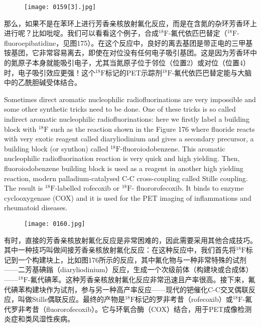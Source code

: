 \documentclass[dvipsnames, svgnames,a4paper,11pt]{article}
\begin{document}
\begin{figure}[h]
	\centering
    \texttt{[image: 0159[3].jpg]}    
     \label{fig175}
\end{figure}

那么，如果不是在苯环上进行芳香亲核放射氟化反应，而是在含氮的杂环芳香环上进行呢？比如吡啶。我们可以看看这个例子，合成${}^\mathrm{18}\mathrm{F}$-氟代依匹巴替定（${}^\mathrm{18}\mathrm{F}$-fluoroepibatidine，见图175）。在这个反应中，良好的离去基团是带正电的三甲基铵基团，它非常容易离去，即使在对位没有任何电子吸引基团。这是因为芳香环中的氮原子本身就能吸引电子，尤其当氮原子位于邻位（位置2）或对位（位置4）时，电子吸引效应更强！这个${}^\mathrm{18}\mathrm{F}$标记的PET示踪剂${}^\mathrm{18}\mathrm{F}$-氟代依匹巴替定能与大脑中的乙酰胆碱受体结合。



Sometimes direct aromatic nucleophilic radiofluorinations are very impossible and
some other synthetic tricks need to be done. One of these tricks is so called indirect
aromatic nucleophilic radiofluorinations: here we firstly label a building block with ${}^\mathrm{18}\mathrm{F}$
such as the reaction shown in the Figure 176 where fluoride reacts with very exotic
reagent called diaryliodinium and gives a secondary precursor, a building block (or
synthon) called ${}^\mathrm{18}\mathrm{F}$-fluoroiodobenzene. This aromatic nucleophilic radiofluorination
reaction is very quick and high yielding. Then, fluoroiodobenzene building block is
used as a reagent in another high yielding reaction, modern palladium-catalysed C-C
cross-coupling called Stille coupling. The result is ${}^\mathrm{18}\mathrm{F}$-labelled rofecoxib or ${}^\mathrm{18}\mathrm{F}$-
fluororofecoxib. It binds to enzyme cyclooxygenase (COX) and it is used for the PET
imaging of inflammations and rheumatoid diseases.

\begin{figure}[h]
	\centering
    \texttt{[image: 0160.jpg]}    
     \label{fig176}
\end{figure}

有时，直接的芳香亲核放射氟化反应是非常困难的，因此需要采用其他合成技巧。其中一种技巧叫做间接芳香亲核放射氟化反应：在这种反应中，我们首先将${}^\mathrm{18}\mathrm{F}$标记到一个构建块上，比如图176所示的反应，其中氟化物与一种非常特殊的试剂——二芳基碘鎓（diaryliodinium）反应，生成一个次级前体（构建块或合成体）——${}^\mathrm{18}\mathrm{F}$-氟代碘苯。这种芳香亲核放射氟化反应非常迅速且产率很高。接下来，氟代碘苯构建块作为试剂，参与另一种高产率反应——现代的钯催化C-C交叉偶联反应，叫做Stille偶联反应。最终的产物是${}^\mathrm{18}\mathrm{F}$标记的罗非考昔（rofecoxib）或${}^\mathrm{18}\mathrm{F}$-氟代罗非考昔（fluororofecoxib）。它与环氧合酶（COX）结合，用于PET成像检测炎症和类风湿性疾病。
\end{document}
